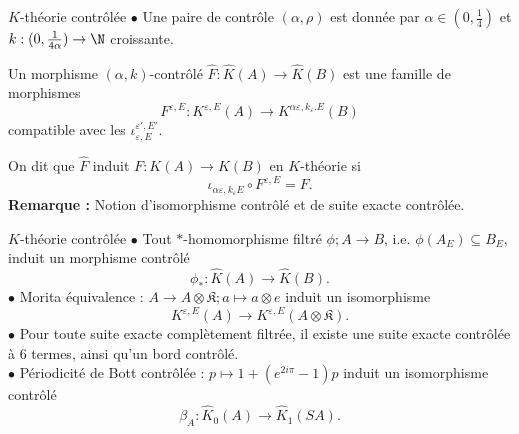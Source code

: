 \begin{frame}{$K$-théorie contrôlée}
$\bullet$ Une paire de contrôle $(\alpha,\rho)$ est donnée par $\alpha\in (0,\frac{1}{4})$ et $k : (0,\frac{1}{4\alpha})\rightarrow \N $ croissante.
\begin{definitionfr}
Un morphisme $(\alpha,k)$-contrôlé $\hat F : \hat K(A) \rightarrow \hat K(B)$ est une famille de morphismes 
\[F^{\varepsilon,E}: K^{\varepsilon,E}(A) \rightarrow K^{\alpha\varepsilon,k_\varepsilon. E}(B)\] 
compatible avec les $\iota_{\varepsilon,E}^{\varepsilon',E'}$.
\end{definitionfr}
\vspace{0.3 cm}
On dit que $\hat F$ induit $F : K(A)\rightarrow K(B)$ en $K$-théorie si 
\[\iota_{\alpha \varepsilon,k_\varepsilon E}\circ F^{\varepsilon,E}=F.\]
\textbf{Remarque :} Notion d'isomorphisme contrôlé et de suite exacte contrôlée.
\end{frame}

\begin{frame}{$K$-théorie contrôlée}
$\bullet$ Tout $*$-homomorphisme filtré $\phi; A\rightarrow B$, i.e. $\phi(A_E)\subseteq B_E$, induit un morphisme contrôlé 
\[\phi_* : \hat K(A)\rightarrow \hat K(B).\]
$\bullet$ Morita équivalence : $A \rightarrow A\otimes\mathfrak K ; a\mapsto a\otimes e$ induit un isomorphisme
\[K^{\varepsilon,E}(A)\rightarrow K^{\varepsilon,E}(A\otimes\mathfrak K).\]
$\bullet$ Pour toute suite exacte complètement filtrée, il existe une suite exacte contrôlée à $6$ termes, ainsi qu'un bord contrôlé.\\
\vspace{0.3 cm}
$\bullet$ Périodicité de Bott contrôlée : $p\mapsto 1+(e^{2i\pi }-1)p$ induit un isomorphisme contrôlé
\[\beta_A :\hat K_0(A) \rightarrow  \hat K_1(SA).\]

\end{frame}